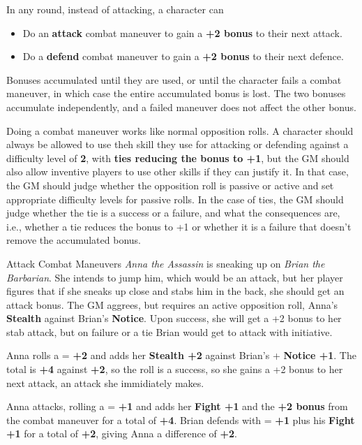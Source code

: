 \begin{multicols}{2}
In any round, instead of attacking, a character can
\begin{itemize}
    \item Do an \textbf{attack} combat maneuver to gain a \textbf{+2 bonus} to their next attack.
    \item Do a \textbf{defend} combat maneuver to gain a \textbf{+2 bonus} to their next defence.
\end{itemize}

Bonuses accumulated until they are used, or until the character fails a combat maneuver, in which case the entire accumulated bonus is lost. The two bonuses accumulate independently, and a failed maneuver does not affect the other bonus.

Doing a combat maneuver works like normal opposition rolls. A character should always be allowed to use theh skill they use for attacking or defending against a difficulty level of \textbf{2}, with \textbf{ties reducing the bonus to +1}, but the GM should also allow inventive players to use other skills if they can justify it. In that case, the GM should judge whether the opposition roll is passive or active and set appropriate difficulty levels for passive rolls. In the case of ties, the GM should judge whether the tie is a success or a failure, and what the consequences are, i.e., whether a tie reduces the bonus to +1 or whether it is a failure that doesn't remove the accumulated bonus.

\begin{Example}{Attack Combat Maneuvers}
    \emph{Anna the Assassin} is sneaking up on \emph{Brian the Barbarian}. She intends to jump him, which would be an attack, but her player figures that if she sneaks up close and stabs him in the back, she should get an attack bonus. The GM aggrees, but requires an active opposition roll, Anna's \textbf{Stealth} against Brian's \textbf{Notice}. Upon success, she will get a +2 bonus to her stab attack, but on failure or a tie Brian would get to attack with initiative.

    Anna rolls a  = \textbf{+2} and adds her \textbf{Stealth +2} against Brian's  + \textbf{Notice +1}. The total is \textbf{+4} against \textbf{+2}, so the roll is a success, so she gains a +2 bonus to her next attack, an attack she immidiately makes.

    Anna attacks, rolling a  = \textbf{+1} and adds her \textbf{Fight +1} and the \textbf{+2 bonus} from the combat maneuver for a total of \textbf{+4}. Brian defends with  = \textbf{+1} plus his \textbf{Fight +1} for a total of \textbf{+2}, giving Anna a difference of \textbf{+2}.
\end{Example}


\end{multicols}

